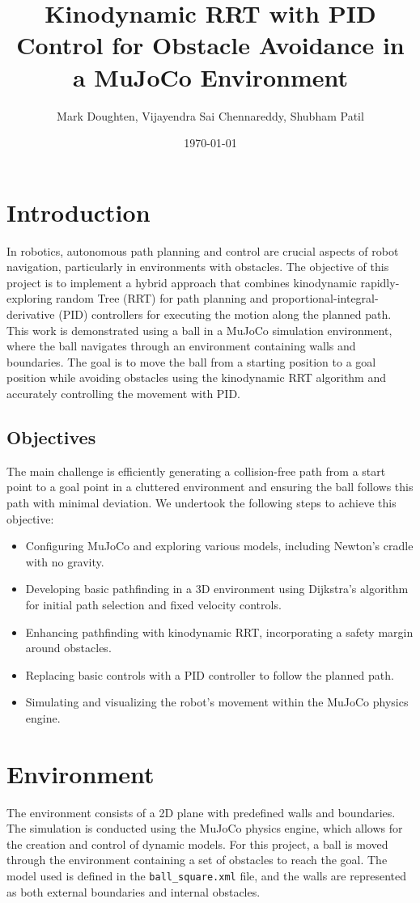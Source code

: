 \documentclass[12pt]{article}
\title{Kinodynamic RRT with PID Control for Obstacle Avoidance in a MuJoCo Environment}
\author{Mark Doughten, Vijayendra Sai Chennareddy, Shubham Patil}
\date{\today}
\begin{document}
\maketitle

\section{Introduction}
In robotics, autonomous path planning and control are crucial aspects of robot navigation, particularly in environments with obstacles. The objective of this project is to implement a hybrid approach that combines kinodynamic rapidly-exploring random Tree (RRT) for path planning and proportional-integral-derivative (PID) controllers for executing the motion along the planned path. This work is demonstrated using a ball in a MuJoCo simulation environment, where the ball navigates through an environment containing walls and boundaries. The goal is to move the ball from a starting position to a goal position while avoiding obstacles using the kinodynamic RRT algorithm and accurately controlling the movement with PID.

\subsection{Objectives}
The main challenge is efficiently generating a collision-free path from a start point to a goal point in a cluttered environment and ensuring the ball follows this path with minimal deviation. We undertook the following steps to achieve this objective:
\begin{itemize}
    \item Configuring MuJoCo and exploring various models, including Newton’s cradle with no gravity.
    \item Developing basic pathfinding in a 3D environment using Dijkstra’s algorithm for initial path selection and fixed velocity controls.
    \item Enhancing pathfinding with kinodynamic RRT, incorporating a safety margin around obstacles.
    \item Replacing basic controls with a PID controller to follow the planned path.
    \item Simulating and visualizing the robot’s movement within the MuJoCo physics engine.
\end{itemize}

\section{Environment}
The environment consists of a 2D plane with predefined walls and boundaries. The simulation is conducted using the MuJoCo physics engine, which allows for the creation and control of dynamic models. For this project, a ball is moved through the environment containing a set of obstacles to reach the goal. The model used is defined in the \texttt{ball\_square.xml} file, and the walls are represented as both external boundaries and internal obstacles.
\end{document}
